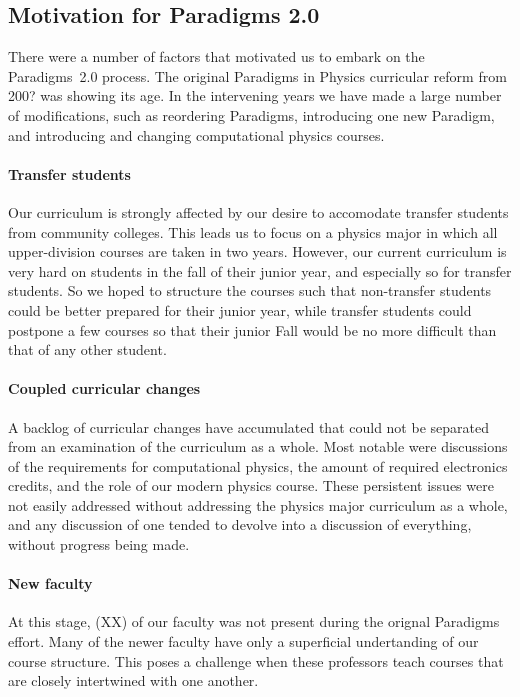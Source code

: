 \documentclass[english,aps,pra,reprint,noshowpacs,superscriptaddress]{revtex4-1}
\begin{document}
\subsection{Motivation for Paradigms 2.0}
There were a number of factors that motivated us to embark on the
Paradigms~2.0 process.  The original Paradigms in Physics curricular
reform from 200? was showing its age.  In the intervening years we
have made a large number of modifications, such as reordering
Paradigms, introducing one new Paradigm, and introducing and changing
computational physics courses.

\paragraph{Transfer students}
Our curriculum is strongly affected by our desire to accomodate
transfer students from community colleges.  This leads us to focus on
a physics major in which all upper-division courses are taken in two
years.  However, our current curriculum is very hard on students in
the fall of their junior year, and especially so for transfer
students.  So we hoped to structure the courses such that non-transfer
students could be better prepared for their junior year, while
transfer students could postpone a few courses so that their junior
Fall would be no more difficult than that of any other student.

\paragraph{Coupled curricular changes}
A backlog of curricular changes have accumulated that could not be
separated from an examination of the curriculum as a whole.  Most
notable were discussions of the requirements for computational
physics, the amount of required electronics credits, and the role of
our modern physics course.  These persistent issues were not easily
addressed without addressing the physics major curriculum as a whole,
and any discussion of one tended to devolve into a discussion of
everything, without progress being made.

\paragraph{New faculty}
At this stage, (XX) of our faculty was not present during the orignal
Paradigms effort.  Many of the newer faculty have only a superficial
undertanding of our course structure.  This poses a challenge when
these professors teach courses that are closely intertwined with one
another.
\end{document}
